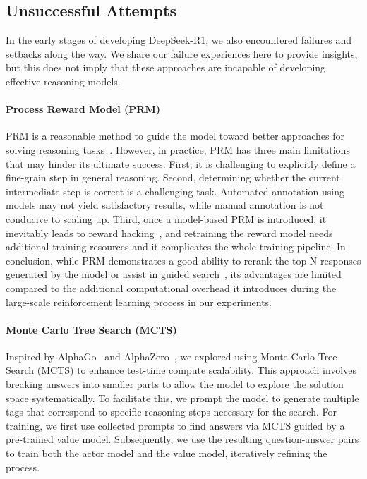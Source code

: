 \documentclass[11pt, a4paper, logo, copyright, nonumbering]{deepseek}
\newcommand{\dsri}{DeepSeek-R1}
\begin{document}
{\subsection{Unsuccessful Attempts}
In the early stages of developing \dsri{}, we also encountered failures and setbacks along the way. We share our failure experiences here to provide insights, but this does not imply that these approaches are incapable of developing effective reasoning models.

\paragraph{Process Reward Model (PRM)}
PRM is a reasonable method to guide the model toward better approaches for solving reasoning tasks~\citep{uesato2022solving, lightman2023let,mathshepherd}. However, in practice, PRM has three main limitations that may hinder its ultimate success. First, it is challenging to explicitly define a fine-grain step in general reasoning. 
Second, determining whether the current intermediate step is correct is a challenging task. Automated annotation using models may not yield satisfactory results, while manual annotation is not conducive to scaling up.
Third, once a model-based PRM is introduced, it inevitably leads to reward hacking~\citep{gao2022scalinglawsrewardmodel},  and retraining the reward model needs additional training resources and it complicates the whole training pipeline. In conclusion, while PRM demonstrates a good ability to rerank the top-N responses generated by the model or assist in guided search~\citep{snell2024scalingllmtesttimecompute}, its advantages are limited compared to the additional computational overhead it introduces during the large-scale reinforcement learning process in our experiments.

\paragraph{Monte Carlo Tree Search (MCTS)}
Inspired by AlphaGo~\citep{alphago} and AlphaZero~\citep{alphazero}, we explored using Monte Carlo Tree Search (MCTS) to enhance test-time compute scalability. This approach involves breaking answers into smaller parts to allow the model to explore the solution space systematically. To facilitate this, we prompt the model to generate multiple tags that correspond to specific reasoning steps necessary for the search. For training, we first use collected prompts to find answers via MCTS guided by a pre-trained value model. Subsequently, we use the resulting question-answer pairs to train both the actor model and the value model, iteratively refining the process.

}
\end{document}
